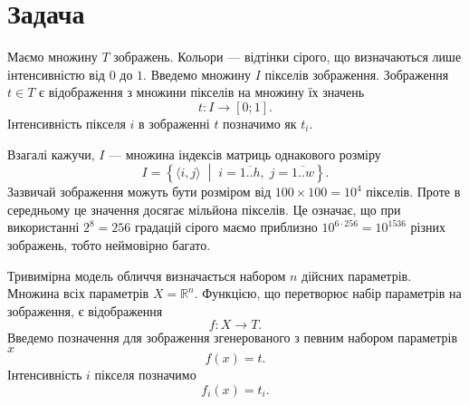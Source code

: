 \section{Задача}

Маємо множину $T$ зображень.
Кольори --- відтінки сірого, що визначаються лише інтенсивністю від $0$ до $1$.
Введемо множину $I$ пікселів зображення.
Зображення $t \in T$ є відображення з множини пікселів на множину їх значень
\begin{equation*}
  t: I \rightarrow \left[ 0; 1 \right].
\end{equation*}
Інтенсивність пікселя $i$ в зображенні $t$ позначимо як $t_i$.

Взагалі кажучи, $I$ --- множина індексів матриць однакового розміру
\begin{equation*}
  I = \left\{ \langle i, j \rangle
    \;\middle|\; i = \overline{1..h},\; j = \overline{1..w}\right\}.
\end{equation*}
Зазвичай зображення можуть бути розміром від $100\times100=10^4$ пікселів.
Проте в середньому це значення досягає мільйона пікселів.
Це означає,
що при використанні $2^8=256$ градацій сірого маємо приблизно
$10^{6 \cdot 256}=10^{1536}$ різних зображень, тобто неймовірно багато.

Тривимірна модель обличчя визначається набором $n$ дійсних параметрів.
Множина всіх параметрів $X = \mathbb{R}^n$.
Функцією, що перетворює набір параметрів на зображення, є відображення
\begin{equation*}
  f: X \rightarrow T.
\end{equation*}
Введемо позначення для зображення згенерованого з певним набором параметрів $x$
\begin{equation*}
  f\left( x \right) = t.
\end{equation*}
Інтенсивність $i$ пікселя позначимо
\begin{equation*}
  f_i\left( x \right) = t_i.
\end{equation*}

